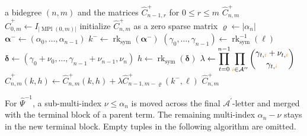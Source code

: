 \documentclass{amsart}
\theoremstyle{definition}
\theoremstyle{remark}
\newcommand{\orange}[1]{{\color{orange}#1}}
\begin{document}
\begin{algorithm}[ht]
\caption{Sparse matrix for $\widehat{\Psi}$}
\label{alg:psi_hat}
\begin{algorithmic}[1]
\Require a bidegree $(n,m)$ and the matrices
$\widehat{C}^{+}_{n-1,r}$ for $0\leq r\leq m$
\Ensure $\widehat{C}^{+}_{n,m}$
    \State
    $\widehat{C}^{+}_{0,m}
    \gets
    I_{|\operatorname{MPl}(0,m)|}$
\Else
    \State initialize $\widehat{C}^{+}_{n,m}$ as a zero sparse matrix
        \State $\varrho\gets|\alpha_n|$
        \State
        $\boldsymbol{\alpha}^{-}
        \gets
        (\alpha_0,\ldots,\alpha_{n-1})$
        \State
        $k^{-}
        \gets
        \operatorname{rk}_{\mathrm{sym}}
        (\boldsymbol{\alpha}^{-})$
            \State
            $(\gamma_0,\ldots,\gamma_{n-1})
            \gets
            \operatorname{rk}_{\mathrm{sym}}^{-1}(\ell)$
                \State
                $\boldsymbol{\delta}
                \gets
                \left(
                    \gamma_0+\nu_0,
                    \ldots,
                    \gamma_{n-1}+\nu_{n-1},
                    \nu_n
                \right)$
                \State
                $h
                \gets
                \operatorname{rk}_{\mathrm{sym}}
                (\boldsymbol{\delta})$
                \State
                $\displaystyle
                \lambda
                \gets
                \prod_{t=0}^{n-1}
                \prod_{\orange{i}\in\mathcal{A}^{\prime\prime}}
                \binom{
                    \gamma_{t,\orange{i}}
                    +
                    \nu_{t,\orange{i}}
                }{
                    \gamma_{t,\orange{i}}
                }$
                \State
                $\widehat{C}^{+}_{n,m}(k,h)
                \gets
                \widehat{C}^{+}_{n,m}(k,h)
                +
                \lambda
                \widehat{C}^{+}_{n-1,m-\varrho}
                (k^{-},\ell)$
            \EndFor
        \EndFor
    \EndFor
\EndIf
\State \Return $\widehat{C}^{+}_{n,m}$
\end{algorithmic}
\end{algorithm}

For $\widehat{\Psi}^{-1}$, a sub-multi-index
$\nu\leq\alpha_n$ is moved across the final
$\mathcal{A}^{\prime}$-letter and merged with the terminal block of a
parent term. The remaining multi-index $\alpha_n-\nu$ stays in the new
terminal block. Empty tuples in the following algorithm are omitted.
\end{document}
